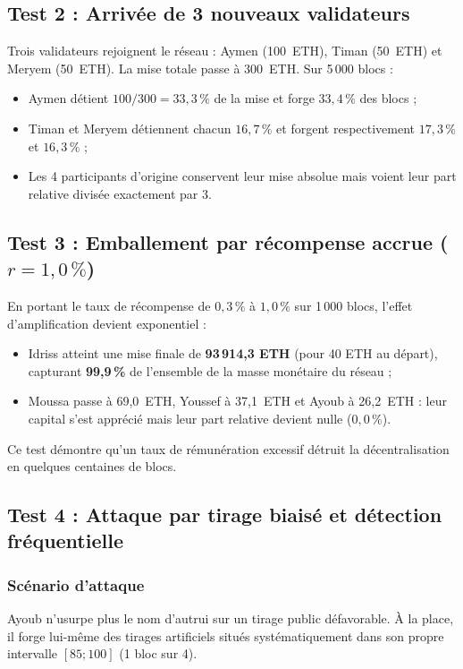 \documentclass[11pt,a4paper]{article}
\begin{document}
\subsection{Test 2 : Arrivée de 3 nouveaux validateurs}
Trois validateurs rejoignent le réseau : Aymen (100~ETH), Timan (50~ETH) et Meryem (50~ETH). La mise totale passe à 300~ETH. Sur 5\,000 blocs :
\begin{itemize}
    \item Aymen détient $100/300 = 33{,}3\,\%$ de la mise et forge $33{,}4\,\%$ des blocs ;
    \item Timan et Meryem détiennent chacun $16{,}7\,\%$ et forgent respectivement $17{,}3\,\%$ et $16{,}3\,\%$ ;
    \item Les 4 participants d'origine conservent leur mise absolue mais voient leur part relative divisée exactement par 3.
\end{itemize}

\subsection{Test 3 : Emballement par récompense accrue ($r = 1{,}0\,\%$)}
En portant le taux de récompense de $0{,}3\,\%$ à $1{,}0\,\%$ sur 1\,000 blocs, l'effet d'amplification devient exponentiel :
\begin{itemize}
    \item Idriss atteint une mise finale de \textbf{93\,914,3 ETH} (pour 40 ETH au départ), capturant \textbf{99,9\,\%} de l'ensemble de la masse monétaire du réseau ;
    \item Moussa passe à 69,0~ETH, Youssef à 37,1~ETH et Ayoub à 26,2~ETH : leur capital s'est apprécié mais leur part relative devient nulle ($0{,}0\,\%$).
\end{itemize}
Ce test démontre qu'un taux de rémunération excessif détruit la décentralisation en quelques centaines de blocs.

\subsection{Test 4 : Attaque par tirage biaisé et détection fréquentielle}

\subsubsection*{Scénario d'attaque}
Ayoub n'usurpe plus le nom d'autrui sur un tirage public défavorable. À la place, il forge lui-même des tirages artificiels situés systématiquement dans son propre intervalle $[85 ; 100]$ (1 bloc sur 4).
\end{document}
